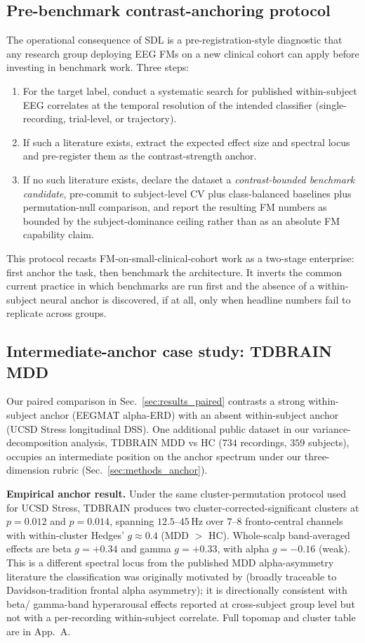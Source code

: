 \subsection{Pre-benchmark contrast-anchoring protocol}
The operational consequence of SDL is a pre-registration-style
diagnostic that any research group deploying EEG FMs on a new
clinical cohort can apply before investing in benchmark work. Three
steps:
\begin{enumerate}
  \item For the target label, conduct a systematic search for
    published within-subject EEG correlates at the temporal
    resolution of the intended classifier (single-recording,
    trial-level, or trajectory).
  \item If such a literature exists, extract the expected effect size
    and spectral locus and pre-register them as the contrast-strength
    anchor.
  \item If no such literature exists, declare the dataset a
    \emph{contrast-bounded benchmark candidate}, pre-commit to
    subject-level CV plus class-balanced baselines plus
    permutation-null comparison, and report the resulting FM numbers
    as bounded by the subject-dominance ceiling rather than as an
    absolute FM capability claim.
\end{enumerate}
This protocol recasts FM-on-small-clinical-cohort work as a two-stage
enterprise: first anchor the task, then benchmark the architecture.
It inverts the common current practice in which benchmarks are run
first and the absence of a within-subject neural anchor is
discovered, if at all, only when headline numbers fail to replicate
across groups.

\subsection{Intermediate-anchor case study: TDBRAIN MDD}
\label{sec:discussion_intermediate}
Our paired comparison in Sec.~\ref{sec:results_paired} contrasts a
strong within-subject anchor (EEGMAT alpha-ERD) with an absent
within-subject anchor (UCSD Stress longitudinal DSS). One additional
public dataset in our variance-decomposition analysis,
TDBRAIN \citep{tdbrain} MDD vs HC ($734$ recordings,
$359$ subjects), occupies an intermediate position on the anchor
spectrum under our three-dimension rubric
(Sec.~\ref{sec:methods_anchor}).

\textbf{Empirical anchor result.} Under the same cluster-permutation
protocol used for UCSD Stress, TDBRAIN produces two
cluster-corrected-significant clusters at $p = 0.012$ and $p = 0.014$,
spanning $12.5$--$45$\,Hz over $7$--$8$ fronto-central channels with
within-cluster Hedges' $g \approx 0.4$ (MDD $>$ HC). Whole-scalp
band-averaged effects are beta $g = +0.34$ and gamma $g = +0.33$, with
alpha $g = -0.16$ (weak). This is a different spectral locus from the
published MDD alpha-asymmetry literature the classification was
originally motivated by (broadly traceable to Davidson-tradition
frontal alpha asymmetry); it is directionally consistent with beta/
gamma-band hyperarousal effects reported at cross-subject group level
\citep{olbrich2013mddarousal} but not with a per-recording
within-subject correlate. Full topomap and cluster table are in
App.~A.

